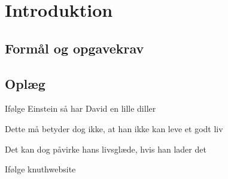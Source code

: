 \section{Introduktion}
    \subsection{Formål og opgavekrav}
        
    \subsection{Oplæg}
        Ifølge Einstein så har David en lille diller\cite{einstein}

        Dette må betyder dog ikke, at han ikke kan leve et godt liv\cite{dirac}

        Det kan dog påvirke hans livsglæde, hvis han lader det\cite{knuth-fa}

        Ifølge knuthwebsite\cite{knuthwebsite}